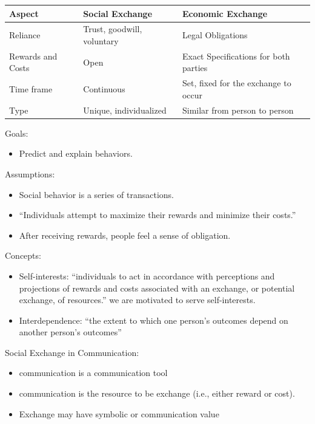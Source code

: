 \documentclass[
]{book}
\providecommand{\tightlist}{%
  \setlength{\itemsep}{0pt}\setlength{\parskip}{0pt}}
\begin{document}
\begin{longtable}[]{@{}lll@{}}
\toprule
Aspect & Social Exchange & Economic Exchange\tabularnewline
\midrule
\endhead
Reliance & Trust, goodwill, voluntary & Legal Obligations\tabularnewline
Rewards and Costs & Open & Exact Specifications for both parties\tabularnewline
Time frame & Continuous & Set, fixed for the exchange to occur\tabularnewline
Type & Unique, individualized & Similar from person to person\tabularnewline
\bottomrule
\end{longtable}

Goals:

\begin{itemize}
\tightlist
\item
  Predict and explain behaviors.
\end{itemize}

Assumptions:

\begin{itemize}
\tightlist
\item
  Social behavior is a series of transactions.\\
\item
  ``Individuals attempt to maximize their rewards and minimize their costs.''\\
\item
  After receiving rewards, people feel a sense of obligation.
\end{itemize}

Concepts:

\begin{itemize}
\tightlist
\item
  Self-interests: ``individuals to act in accordance with perceptions and projections of rewards and costs associated with an exchange, or potential exchange, of resources.'' we are motivated to serve self-interests.\\
\item
  Interdependence: ``the extent to which one person's outcomes depend on another person's outcomes''
\end{itemize}

Social Exchange in Communication:

\begin{itemize}
\tightlist
\item
  communication is a communication tool
\item
  communication is the resource to be exchange (i.e., either reward or cost).\\
\item
  Exchange may have symbolic or communication value \citep{Molm_2007}
\end{itemize}
\end{document}
